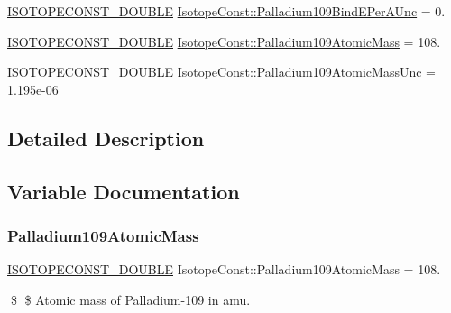 \begin{DoxyCompactItemize}
\mbox{\hyperlink{group___isotope_const-_macros_ga8f45a7272ce02c0b4c65c44636ed719a}{I\+S\+O\+T\+O\+P\+E\+C\+O\+N\+S\+T\+\_\+\+D\+O\+U\+B\+LE}} \mbox{\hyperlink{group___isotope_const-_palladium-_pd109_ga46f9d7288fa1e29f067890051a99eaa0}{Isotope\+Const\+::\+Palladium109\+Bind\+E\+Per\+A\+Unc}} = 0.
\item 
\mbox{\hyperlink{group___isotope_const-_macros_ga8f45a7272ce02c0b4c65c44636ed719a}{I\+S\+O\+T\+O\+P\+E\+C\+O\+N\+S\+T\+\_\+\+D\+O\+U\+B\+LE}} \mbox{\hyperlink{group___isotope_const-_palladium-_pd109_gacf4f4f29d61ad2a0a17ddd11fae33354}{Isotope\+Const\+::\+Palladium109\+Atomic\+Mass}} = 108.
\item 
\mbox{\hyperlink{group___isotope_const-_macros_ga8f45a7272ce02c0b4c65c44636ed719a}{I\+S\+O\+T\+O\+P\+E\+C\+O\+N\+S\+T\+\_\+\+D\+O\+U\+B\+LE}} \mbox{\hyperlink{group___isotope_const-_palladium-_pd109_gab919ccb49a0b909de9048b8e46aa96ae}{Isotope\+Const\+::\+Palladium109\+Atomic\+Mass\+Unc}} = 1.\+195e-\/06
\end{DoxyCompactItemize}


\subsection{Detailed Description}


\subsection{Variable Documentation}
\mbox{\label{group___isotope_const-_palladium-_pd109_gacf4f4f29d61ad2a0a17ddd11fae33354}} 
\subsubsection{\texorpdfstring{Palladium109\+Atomic\+Mass}{Palladium109AtomicMass}}
{\footnotesize\ttfamily \mbox{\hyperlink{group___isotope_const-_macros_ga8f45a7272ce02c0b4c65c44636ed719a}{I\+S\+O\+T\+O\+P\+E\+C\+O\+N\+S\+T\+\_\+\+D\+O\+U\+B\+LE}} Isotope\+Const\+::\+Palladium109\+Atomic\+Mass = 108.}

\$ \$ Atomic mass of Palladium-\/109 in amu. \mbox{\label{group___isotope_const-_palladium-_pd109_gab919ccb49a0b909de9048b8e46aa96ae}} 
